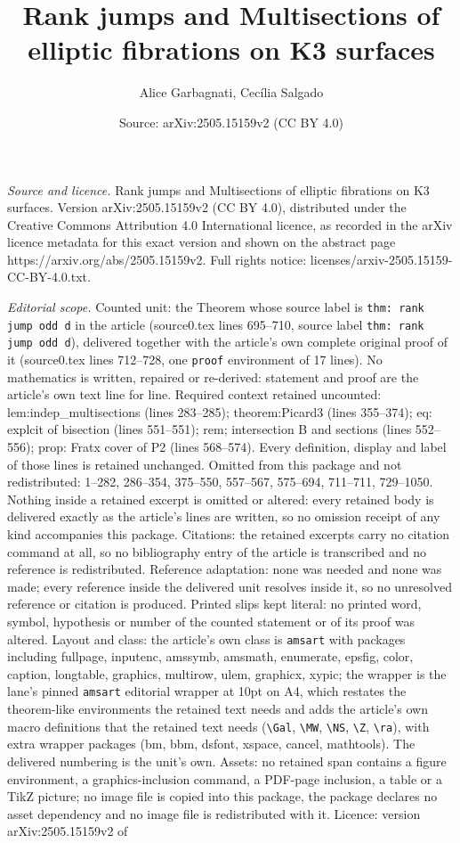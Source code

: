 \documentclass[10pt,a4paper]{amsart}
\title[Rank jumps and Multisections of elliptic fibrations on K3 su]{Rank jumps and Multisections of elliptic fibrations on K3 surfaces}
\author{Alice Garbagnati, Cec\'ilia Salgado}
\date{Source: arXiv:2505.15159v2 (CC BY 4.0)}
\begin{document}
\maketitle

\noindent\emph{Source and licence.} Rank jumps and Multisections of elliptic fibrations on K3 surfaces. Version arXiv:2505.15159v2 (CC BY 4.0), distributed under the Creative Commons Attribution 4.0 International licence, as recorded in the arXiv licence metadata for this exact version and shown on the abstract page https://arxiv.org/abs/2505.15159v2. Full rights notice: licenses/arxiv-2505.15159-CC-BY-4.0.txt.\par\smallskip

\noindent\textit{Editorial scope.} Counted unit: the Theorem whose source label is \texttt{thm: rank jump odd d} in the article (source0.tex lines 695--710, source label \texttt{thm: rank jump odd d}), delivered together with the article's own complete original proof of it (source0.tex lines 712--728, one \texttt{proof} environment of 17 lines). No mathematics is written, repaired or re-derived: statement and proof are the article's own text line for line. Required context retained uncounted: lem:indep\_multisections (lines 283--285); theorem:Picard3 (lines 355--374); eq: explcit of bisection (lines 551--551); rem; intersection B and sections (lines 552--556); prop: Fratx cover of P2 (lines 568--574). Every definition, display and label of those lines is retained unchanged. Omitted from this package and not redistributed: 1--282, 286--354, 375--550, 557--567, 575--694, 711--711, 729--1050. Nothing inside a retained excerpt is omitted or altered: every retained body is delivered exactly as the article's lines are written, so no omission receipt of any kind accompanies this package. Citations: the retained excerpts carry no citation command at all, so no bibliography entry of the article is transcribed and no reference is redistributed. Reference adaptation: none was needed and none was made; every reference inside the delivered unit resolves inside it, so no unresolved reference or citation is produced. Printed slips kept literal: no printed word, symbol, hypothesis or number of the counted statement or of its proof was altered. Layout and class: the article's own class is \texttt{amsart} with packages including fullpage, inputenc, amssymb, amsmath, enumerate, epsfig, color, caption, longtable, graphics, multirow, ulem, graphicx, xypic; the wrapper is the lane's pinned \texttt{amsart} editorial wrapper at 10pt on A4, which restates the theorem-like environments the retained text needs and adds the article's own macro definitions that the retained text needs (\texttt{\textbackslash Gal}, \texttt{\textbackslash MW}, \texttt{\textbackslash NS}, \texttt{\textbackslash Z}, \texttt{\textbackslash ra}), with extra wrapper packages (bm, bbm, dsfont, xspace, cancel, mathtools). The delivered numbering is the unit's own. Assets: no retained span contains a figure environment, a graphics-inclusion command, a PDF-page inclusion, a table or a TikZ picture; no image file is copied into this package, the package declares no asset dependency and no image file is redistributed with it. Licence: version arXiv:2505.15159v2 of 
\end{document}
